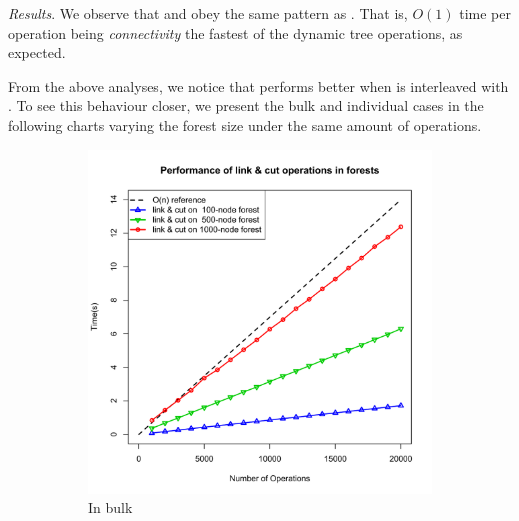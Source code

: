 \textit{\emph{Results}}. We observe that \cut and \conn obey the same pattern as \link. That is, $O(1)$ time per operation being \textit{connectivity} the fastest of the dynamic tree operations, as expected.

From the above analyses, we notice that \link performs better when is interleaved with \cut. To see this behaviour closer, we present the bulk and individual cases in the following charts varying the forest size under the same amount of operations.

\begin{figure}[H]
\centering
\begin{subfigure}{.5\textwidth}
  \centering
  \includegraphics[scale=0.38]{./Images/plotForests}
  \caption{In bulk}
\end{subfigure}%
\begin{subfigure}{.5\textwidth}
  \centering

\end{subfigure}
\end{figure}

